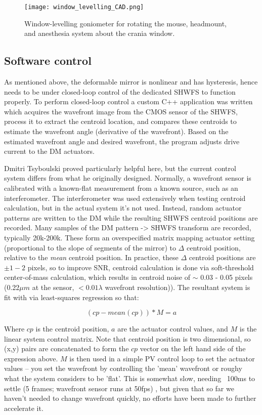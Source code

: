 \documentclass[a4paper,12pt]{article}
\begin{document}
\begin{figure}
\label{window_level}
\centering
\texttt{[image: window\_levelling\_CAD.png]}
\caption{Window-levelling goniometer for rotating the mouse, headmount, and anesthesia system about the crania window. }
\end{figure}

\subsection{Software control}

As mentioned above, the deformable mirror is nonlinear and has hysteresis, hence needs to be under closed-loop control of the dedicated SHWFS to function properly.  To perform closed-loop control a custom C++ application was written which acquires the wavefront image from the CMOS sensor of the SHWFS, process it to extract the centroid location, and compares these centroids to estimate the wavefront angle (derivative of the wavefront).  Based on the estimated wavefront angle and desired wavefront, the program adjusts drive current to the DM actuators.  

Dmitri Tsyboulski proved particularly helpful here, but the current control system differs from what he originally designed.  Normally, a wavefront sensor is calibrated with a known-flat measurement from a known source, such as an interferometer.  The interferometer was used extensively when testing centroid calculation, but in the actual system it's not used.  Instead, random actuator patterns are written to the DM while the resulting SHWFS centroid positions are recorded.  Many samples of the DM pattern -> SHWFS transform are recorded, typically 20k-200k.  These form an overspecified matrix mapping actuator setting (proportional to the slope of segments of the mirror) to $\Delta$ centroid position, relative to the \textsl{mean} centroid position.  In practice, these $\Delta$ centroid positions are $\pm 1-2$ pixels, so to improve SNR, centroid calculation is done via soft-threshold center-of-mass calculation, which results in centroid noise of $\sim$ 0.03 - 0.05 pixels (0.22$\mu m$ at the sensor, $< 0.01 \lambda $ wavefront resolution)).  The resultant system is fit with via least-squares regression so that: 

$$ (cp - mean(cp)) * M = a $$

Where $cp$ is the centroid position, $a$ are the actuator control values, and $M$ is the linear system control matrix.  Note that centroid position is two dimensional, so (x,y) pairs are concatenated to form the $cp$ vector on the left hand side of the expression above. $M$ is then used in a simple PV control loop to set the actuator values -- you set the wavefront by controlling the 'mean' wavefront or roughy what the system considers to be 'flat'.  This is somewhat slow, needing ~100ms to settle (5 frames; wavefront sensor runs at 50fps) , but given that so far we haven't needed to change wavefront quickly, no efforts have been made to further accelerate it.  
\end{document}
